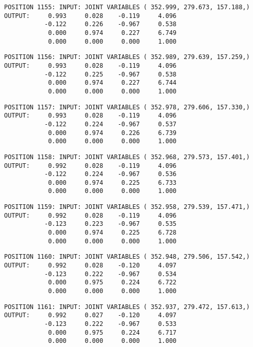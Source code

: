 \begin{verbatim}
POSITION 1155: INPUT: JOINT VARIABLES ( 352.999, 279.673, 157.188,)
OUTPUT:     0.993     0.028    -0.119     4.096
           -0.122     0.226    -0.967     0.538
            0.000     0.974     0.227     6.749
            0.000     0.000     0.000     1.000
\end{verbatim} \pagebreak[1]\begin{verbatim}
POSITION 1156: INPUT: JOINT VARIABLES ( 352.989, 279.639, 157.259,)
OUTPUT:     0.993     0.028    -0.119     4.096
           -0.122     0.225    -0.967     0.538
            0.000     0.974     0.227     6.744
            0.000     0.000     0.000     1.000
\end{verbatim} \pagebreak[1]\begin{verbatim}
POSITION 1157: INPUT: JOINT VARIABLES ( 352.978, 279.606, 157.330,)
OUTPUT:     0.993     0.028    -0.119     4.096
           -0.122     0.224    -0.967     0.537
            0.000     0.974     0.226     6.739
            0.000     0.000     0.000     1.000
\end{verbatim} \pagebreak[1]\begin{verbatim}
POSITION 1158: INPUT: JOINT VARIABLES ( 352.968, 279.573, 157.401,)
OUTPUT:     0.992     0.028    -0.119     4.096
           -0.122     0.224    -0.967     0.536
            0.000     0.974     0.225     6.733
            0.000     0.000     0.000     1.000
\end{verbatim} \pagebreak[1]\begin{verbatim}
POSITION 1159: INPUT: JOINT VARIABLES ( 352.958, 279.539, 157.471,)
OUTPUT:     0.992     0.028    -0.119     4.096
           -0.123     0.223    -0.967     0.535
            0.000     0.974     0.225     6.728
            0.000     0.000     0.000     1.000
\end{verbatim} \pagebreak[1]\begin{verbatim}
POSITION 1160: INPUT: JOINT VARIABLES ( 352.948, 279.506, 157.542,)
OUTPUT:     0.992     0.028    -0.120     4.097
           -0.123     0.222    -0.967     0.534
            0.000     0.975     0.224     6.722
            0.000     0.000     0.000     1.000
\end{verbatim} \pagebreak[1]\begin{verbatim}
POSITION 1161: INPUT: JOINT VARIABLES ( 352.937, 279.472, 157.613,)
OUTPUT:     0.992     0.027    -0.120     4.097
           -0.123     0.222    -0.967     0.533
            0.000     0.975     0.224     6.717
            0.000     0.000     0.000     1.000
\end{verbatim} \pagebreak[1]\begin{verbatim}

\end{verbatim}

